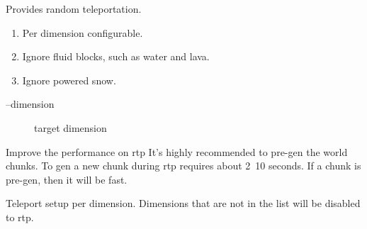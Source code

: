 
Provides random teleportation.

\begin{enumerate}
    \item Per dimension configurable.
    \item Ignore fluid blocks, such as water and lava.
    \item Ignore powered snow.
\end{enumerate}

\begin{description}
    \item [--dimension] target dimension
\end{description}

\begin{tips}{Improve the performance on rtp}
    It's highly recommended to pre-gen the world chunks.
    To gen a new chunk during rtp requires about 2~10 seconds.
    If a chunk is pre-gen, then it will be fast.
\end{tips}

Teleport setup per dimension.
Dimensions that are not in the list will be disabled to rtp.




